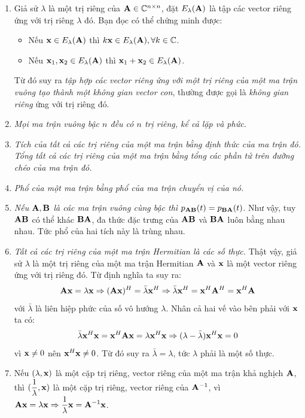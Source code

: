 \def\ElA{E_{\lambda}(\bA)}
\begin{enumerate}
\item Giả sử $\lambda$ là một trị riêng của $\mathbf{A} \in \mathbb{C}^{n\times n}$, đặt $\ElA$ là tập các vector riêng ứng với trị riêng $\lambda$ đó. Bạn đọc có thể chứng minh được:
\begin{itemize}
\item Nếu $\bx \in \ElA$ thì $k\bx \in \ElA, \forall k \in \mathbb{C}$.

\item Nếu $\bx_1, \bx_2 \in \ElA$ thì $\bx_1 + \bx_2 \in \ElA$.
\end{itemize}
Từ đó suy ra \textit{tập hợp các vector riêng ứng với một trị riêng của một
ma trận vuông tạo thành một không gian vector con}, thường được gọi là
\textit{không gian riêng} ứng với trị riêng đó.

\item \textit{Mọi ma trận vuông bậc $n$ đều có $n$ trị riêng, kể cả lặp và phức.}

\item \textit{Tích của tất cả các trị riêng của một ma trận bằng định thức
của ma trận đó. Tổng tất cả các trị riêng của một ma trận bằng tổng các
phần tử trên đường chéo của ma trận đó.}


\item \textit{Phổ của một ma trận bằng phổ của ma trận chuyển vị của nó.}


\item \textit{Nếu $\mathbf{A}, \mathbf{B}$ là các ma trận vuông cùng bậc thì
$p_{\mathbf{A}\mathbf{B}}(t) = p_ {\mathbf{B}\mathbf{A}}(t)$}. Như vậy, tuy $\mathbf{A}\mathbf{B}$ có thể khác
$\mathbf{B}\mathbf{A}$, đa thức đặc trưng của $\mathbf{A}\mathbf{B}$ và $\mathbf{B}\mathbf{A}$ luôn bằng nhau
nhau. Tức phổ của hai tích này là trùng nhau.

\item \textit{Tất cả các trị riêng của một ma trận Hermitian là các số
thực.} Thật vậy, giả sử $\lambda$ là một trị riêng của một ma trận Hermitian $\mathbf{A}$ và $\mathbf{x}$ là một vector riêng ứng với trị riêng đó. Từ định nghĩa ta
suy ra:
\begin{equation}
\mathbf{A}\mathbf{x} = \lambda\mathbf{x} \Rightarrow (\mathbf{A}\mathbf{x})^H = \bar{\lambda} \mathbf{x}^H
\Rightarrow  \bar{\lambda}\mathbf{x}^H = \mathbf{x}^H\mathbf{A}^H = \mathbf{x}^H\mathbf{A}
\end{equation}
với $\bar{\lambda}$ là liên hiệp phức của số vô hướng $\lambda$. Nhân cả hai
vế vào bên phải với $\mathbf{x}$ ta có:
\begin{equation}
\bar{\lambda}\mathbf{x}^H\mathbf{x} = \mathbf{x}^H\mathbf{A}\mathbf{x} = \lambda \mathbf{x}^H \mathbf{x} \Rightarrow
(\lambda - \bar{\lambda})\mathbf{x}^H\mathbf{x} = 0
\end{equation}
vì $\mathbf{x} \neq 0$ nên $\mathbf{x}^H\mathbf{x} \neq 0$. Từ đó suy ra $\bar{\lambda} =
\lambda$, tức $\lambda$ phải là một số thực.

\item Nếu $(\lambda, \mathbf{x})$ là một cặp trị riêng, vector riêng của một ma
trận khả nghịch $\mathbf{A}$, thì $\displaystyle(\frac{1}{\lambda}, \mathbf{x})$ là một
cặp trị riêng, vector riêng của $\mathbf{A}^{-1}$, vì $\displaystyle \mathbf{A}\mathbf{x} =
\lambda\mathbf{x} \Rightarrow \frac{1} {\lambda}\mathbf{x} = \mathbf{A}^{-1}\mathbf{x}$.


\end{enumerate}


